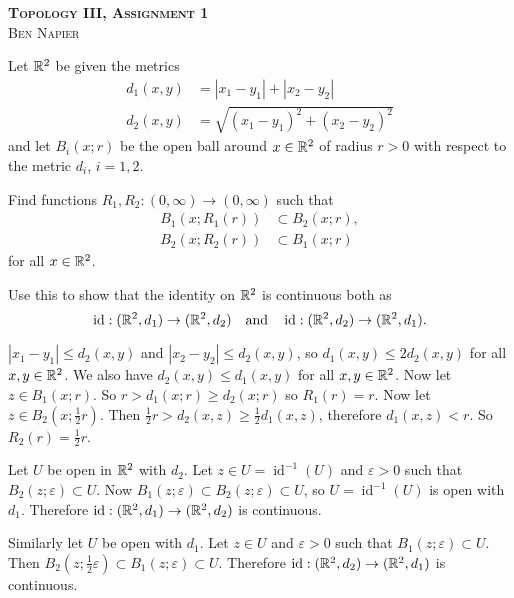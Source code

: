 \documentclass[a4paper, answers]{exam}
\begin{document}
\begin{center}
	\textbf{\textsc{Topology III, Assignment 1}}
	\\
	\textsc{Ben Napier}
	\vspace{1em}
\end{center}
\begin{questions}
	\question
		Let $\mathbb{R}^2$ be given the metrics
		\begin{align*}
			d_1(x,y) &= \left\lvert x_1 - y_1 \right\rvert 
						+ \left\lvert x_2 - y_2 \right\rvert \\
			d_2(x,y) &= \sqrt{(x_1 - y_1)^2 + (x_2 - y_2)^2}
		\end{align*}
		and let $B_i(x;r)$ be the open ball around $x \in \mathbb{R}^2$ of radius
		$r > 0$ with respect to the metric $d_i$, $i = 1, 2$.

		Find functions $R_1, R_2: (0, \infty) \to (0, \infty)$ such that
		\begin{align*}
			B_1(x;R_1(r)) &\subset B_2(x;r), \\
			B_2(x;R_2(r)) &\subset B_1(x;r)
		\end{align*}
		for all $x \in \mathbb{R}^2$.
		
		Use this to show that the identity on $\mathbb{R}^2$ is continuous both as
		\[
			\operatorname{id}: (\mathbb{R}^2, d_1) \to (\mathbb{R}^2, d_2)
			\quad\text{and}\quad
			\operatorname{id}: (\mathbb{R}^2, d_2) \to (\mathbb{R}^2, d_1).
		\]

		\begin{solution}
			$\left\lvert x_1 - y_1 \right\rvert \leq d_2(x,y)$
			and $\left\lvert x_2 - y_2 \right\rvert \leq d_2(x,y)$,
			so $d_1(x,y) \leq 2d_2(x,y)$ for all $x,y \in \mathbb{R}^2$.
			We also have $d_2(x,y) \leq d_1(x,y)$ for all $x,y \in \mathbb{R}^2$.
			Now let $z \in B_1(x; r)$. So $r > d_1(x;r) \geq d_2(x;r)$
			so $R_1(r) = r$.
			Now let $z \in B_2\left( x; \frac12r \right)$.
			Then $\frac12r > d_2(x,z) \geq \frac12 d_1(x,z)$,
			therefore $d_1(x,z) < r$.
			So $R_2(r) = \frac12r$.

			Let $U$ be open in $\mathbb{R}^2$ with $d_2$.
			Let $z \in U = \operatorname{id}^{-1}(U)$
			and $\varepsilon > 0$ such that $B_2(z; \varepsilon) \subset U$.
			Now $B_1(z; \varepsilon) \subset B_2(z; \varepsilon) \subset U$,
			so $U = \operatorname{id}^{-1}(U)$ is open with $d_1$. 
			Therefore 
			$\operatorname{id}: (\mathbb{R}^2, d_1) \to (\mathbb{R}^2, d_2)$ is continuous.

			Similarly let $U$ be open with $d_1$.
			Let $z \in U$ and $\varepsilon > 0$ such that 
			$B_1(z; \varepsilon) \subset U$.
			Then $
				B_2\left(z; \frac12\varepsilon\right) 
				\subset B_1(z; \varepsilon)
				\subset U
			$. 
			Therefore
			$\operatorname{id}: (\mathbb{R}^2, d_2) \to (\mathbb{R}^2, d_1)$ is continuous.
		\end{solution}
	

\end{questions}
\end{document}
